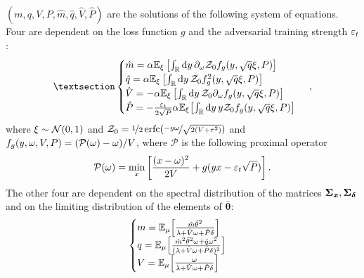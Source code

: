 \documentclass[a0paper,fleqn]{betterportraitposter}
\theoremstyle{plain}
\theoremstyle{definition}
\theoremstyle{remark}
\begin{document}
{\begin{multicols}{3}
\((m, q, V, P, \hat{m}, \hat{q}, \hat{V}, \hat{P})\) are the solutions of the following system of equations.
Four are dependent on the loss function \(g\) and the adversarial training strength \(\varepsilon_t\):
\begin{equation}\label{eq:saddle-point-channel-main-thm}§
    \begin{cases}
        \hat{m} = \alpha \mathbb{E}_{\xi}\left[
            \int_{\RR} \dd{y} \partial_\omega \mathcal{Z}_0 f_g(y, \sqrt{q} \xi, P)
        \right] \\
        \hat{q} = \alpha \mathbb{E}_{\xi}\left[
            \int_{\RR} \dd{y} \mathcal{Z}_0 f_g^2(y, \sqrt{q} \xi, P)
        \right] \\
        \hat{V} = -\alpha \mathbb{E}_{\xi}\left[
            \int_{\RR} \dd{y} \mathcal{Z}_0 \partial_\omega f_g(y, \sqrt{q} \xi, P)
        \right] \\
        \hat{P} = - \frac{\advtrainingcost}{2 \sqrt{P}} \alpha \mathbb{E}_{\xi} \qty[ 
            \int_{\RR} \dd{y} y \mathcal{Z}_0 f_g (y, \sqrt{q} \xi, P)
        ] 
    \end{cases} \,,
\end{equation}
where \(\xi \sim \mathcal{N}\qty(0, 1)\) and 
\(\mathcal{Z}_{0} = \nicefrac{1}{2} \operatorname*{erfc}(\nicefrac{- y \omega}{ \sqrt{2(V + \tau^2)}})\) and \(f_{g}(y, \omega, V, P) = \qty(\mathcal{P}(\omega) - \omega) / V\), where \(\mathcal{P}\) is the following proximal operator
\begin{equation}
    \mathcal{P} (\omega) = \min_x \qty[\frac{(x - \omega)^2}{2 V} + g(yx - \varepsilon_t \sqrt{P})] \,.
\end{equation}
The other four are dependent on the spectral distribution of the matrices \(\boldsymbol{\Sigma}_{\boldsymbol{\boldsymbol{x}}}, \boldsymbol{\Sigma}_{\boldsymbol{\delta}}\) and on the limiting distribution of the elements of \(\bar{\boldsymbol{\theta}}\):
\begin{equation}\label{eq:saddle-point-prior-main-thm}
    \begin{cases}
        m = \mathbb{E}_{\mu} \qty[ 
            \frac{\hat{m} \bar{\theta}^2}{\lambda + \hat{V} \omega + \hat{P} \delta} 
        ] \\
        q = \mathbb{E}_{\mu} \qty[ 
            \frac{
                \hat{m}^2 \bar{\theta}^2 \omega + \hat{q} \omega^2
            }{
                (\lambda + \hat{V} \omega + \hat{P} \delta)^2
            } 
        ] \\
        V = \mathbb{E}_{\mu} \qty[ 
            \frac{\omega}{\lambda + \hat{V} \omega + \hat{P} \delta } 
        ] \\

\end{cases}
\end{equation}
\end{multicols}}
\end{document}
